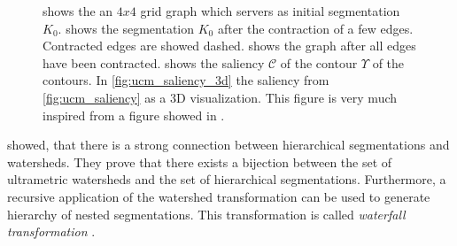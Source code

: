 \begin{figure}
{{    }%
    }%
    \caption[Ultra metric contour map saliency]{
         shows the an $4x4$ grid graph which servers as initial segmentation $K_0$.
         shows the segmentation $K_0$ after the contraction of a few edges.
        Contracted edges are showed dashed.
         shows the graph after all edges have been contracted.
         shows the saliency $\mathcal{C}$ of the contour $\Upsilon$ of the contours.
        In \cref{fig:ucm_saliency_3d} the saliency from \ref{fig:ucm_saliency} as a 3D visualization.
        This figure is very much inspired from a figure showed in \citep{arbelaez_2006_cvpr}.
    }\label{fig:ucm_visu}
\end{figure}




 showed, that there is a
strong connection between hierarchical segmentations
and watersheds.
They prove that there exists a bijection between
the set of ultrametric watersheds\citep{najman_2010_corr} and the set of hierarchical segmentations.
Furthermore, a recursive application of the watershed transformation  can
be used to generate hierarchy of nested segmentations.
This transformation is called \emph{waterfall transformation} \citep{beuchner_1994_waterfall} .
